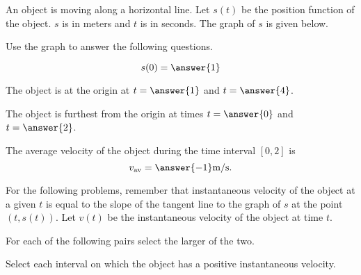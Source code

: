 \documentclass{ximera}
\author{Nela Lakos \and Kyle Parsons}
\begin{document}
\begin{exercise}

An object is moving along a horizontal line.  Let $s(t)$ be the position function of the object.  $s$ is in meters and $t$ is in seconds.  The graph of $s$ is given below.


\begin{image}
\end{image}

Use the graph to answer the following questions.

\[
s(0) = \answer{1}
\]

The object is at the origin at $t = \answer{1}$ and $t = \answer{4}$.

The object is furthest from the origin at times $t = \answer{0}$ and $t = \answer{2}$.

The average velocity of the object during the time interval $[0,2]$ is
\[
v_{\text{av}} = \answer{-1}\text{m/s.}
\]

For the following problems, remember that instantaneous velocity of the object at a given $t$ is equal to the slope of the tangent line to the graph of $s$ at the point $(t,s(t))$.  Let $v(t)$ be the instantaneous velocity of the object at time $t$.

For each of the following pairs select the larger of the two.

\begin{multipleChoice}
\end{multipleChoice}

\begin{multipleChoice}
\end{multipleChoice}

\begin{multipleChoice}
\end{multipleChoice}

Select each interval on which the object has a positive instantaneous velocity.

\begin{selectAll}
\end{selectAll}

\end{exercise}
\end{document}
